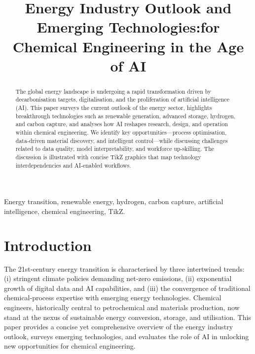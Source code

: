 \documentclass[conference]{IEEEtran}
\title{Energy Industry Outlook and Emerging Technologies:\nOpportunities for Chemical Engineering in the Age of AI}
\author{\IEEEauthorblockN{Anderson Chen}
\IEEEauthorblockA{Department of Chemical Engineering\\
University of Example\\
Email: anderson.chen@example.com}}
\begin{document}
\maketitle

\begin{abstract}
The global energy landscape is undergoing a rapid transformation driven by decarbonisation targets, digitalisation, and the proliferation of artificial intelligence (AI).  This paper surveys the current outlook of the energy sector, highlights breakthrough technologies such as renewable generation, advanced storage, hydrogen, and carbon capture, and analyses how AI reshapes research, design, and operation within chemical engineering.  We identify key opportunities—process optimisation, data‑driven material discovery, and intelligent control—while discussing challenges related to data quality, model interpretability, and workforce up‑skilling.  The discussion is illustrated with concise TikZ graphics that map technology interdependencies and AI‑enabled workflows.
\end{abstract}

\begin{IEEEkeywords}
Energy transition, renewable energy, hydrogen, carbon capture, artificial intelligence, chemical engineering, TikZ.
\end{IEEEkeywords}

\section{Introduction}
The 21st‑century energy transition is characterised by three intertwined trends: (i) stringent climate policies demanding net‑zero emissions, (ii) exponential growth of digital data and AI capabilities, and (iii) the convergence of traditional chemical‑process expertise with emerging energy technologies.  Chemical engineers, historically central to petrochemical and materials production, now stand at the nexus of sustainable energy conversion, storage, and utilisation.  This paper provides a concise yet comprehensive overview of the energy industry outlook, surveys emerging technologies, and evaluates the role of AI in unlocking new opportunities for chemical engineering.

\end{document}
